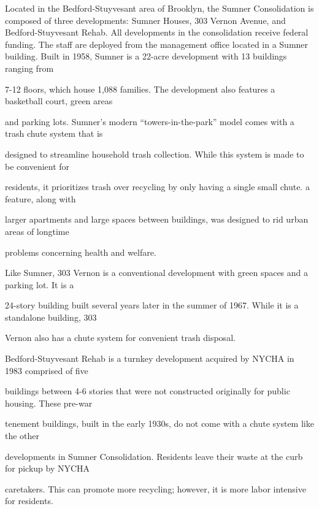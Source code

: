 																																												Located in the Bedford-Stuyvesant area of Brooklyn, the Sumner Consolidation is composed of three developments: Sumner Houses, 303 Vernon Avenue, and Bedford-Stuyvesant Rehab. All developments in the consolidation 	receive federal funding. The staff are deployed from the management office located in a Sumner building. Built in 1958, Sumner is a 22-acre development with 13 buildings ranging from

																																																									7-12 floors, which house 1,088 families. The development also features a basketball court, green areas

																																																									and parking lots. Sumner's modern ``towers-in-the-park'' model comes with a trash chute system that is

																																																									designed to streamline household trash collection. While this system is made to be convenient for

																																																									residents, it prioritizes trash over recycling by only having a single small chute. a feature, along with

																																																									larger apartments and large spaces between buildings, was designed to rid urban areas of longtime

																																																									problems concerning health and welfare.

																																																									Like Sumner, 303 Vernon is a conventional development with green spaces and a parking lot. It is a

																																																									24-story building built several years later in the summer of 1967. While it is a standalone building, 303

																																																									Vernon also has a chute system for convenient trash disposal.

																																																									Bedford-Stuyvesant Rehab is a turnkey development acquired by NYCHA in 1983 comprised of five

																																																									buildings between 4-6 stories that were not constructed originally for public housing. These pre-war

																																																									tenement buildings, built in the early 1930s, do not come with a chute system like the other

																																																									developments in Sumner Consolidation. Residents leave their waste at the curb for pickup by NYCHA

	caretakers. This can promote more recycling; however, it is more labor intensive for residents.